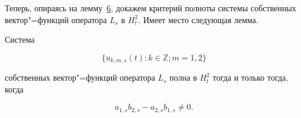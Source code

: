 \smallskip



Теперь, опираясь на лемму~\hyperlink{korn:lemma:6}{6}, докажем критерий полноты системы собственных вектор"=функций оператора $L_s$ в $H_t^2$. Имеет место следующая лемма.



\smallskip



\hypertarget{korn:lemma:7}{}



\begin{lemma}[7]Система

\begin{equation}

\label{kor:eq2.13}

\{u_{k,m,s}(t):k\in\mathbb{Z};m=1,2\}

\end{equation}

собственных вектор"=функций оператора $L_s$ полна в $H_t^2$ тогда и только тогда$,$ когда

\begin{equation}

\label{kor:eq2.14}

a_{1,s}b_{2,s}-a_{2,s}b_{1,s}\ne0.

\end{equation}

\end{lemma}



\smallskip



